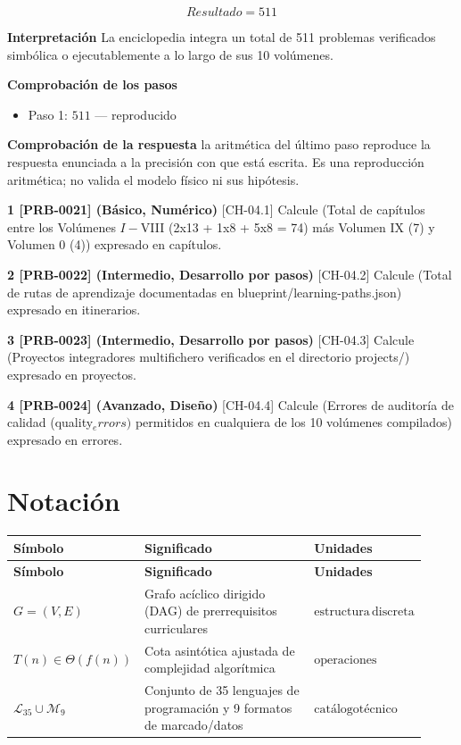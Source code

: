 \documentclass{book}
\begin{document}
\begin{tcolorbox}[title={Problema resuelto}, studiumworked, breakable]
\[
Resultado = 511
\]

\noindent\textbf{Interpretación}
La enciclopedia integra un total de 511 problemas verificados simbólica o ejecutablemente a lo largo de sus 10 volúmenes.

\noindent\textbf{Comprobación de los pasos}
\begin{itemize}
\item Paso 1: $511$ — reproducido
\end{itemize}

\noindent\textbf{Comprobación de la respuesta} la aritmética del último paso reproduce la respuesta enunciada a la precisión con que está escrita. Es una reproducción aritmética; no valida el modelo físico ni sus hipótesis.
\end{tcolorbox}

\begin{tcolorbox}[title={Ejercicios}, studiumworked, breakable]

\noindent\textbf{1 [PRB-0021] (Básico, Numérico)}
[CH-04.1] Calcule (Total de capítulos entre los Volúmenes \(I-\)VIII (2x13 + 1x8 + 5x8 = 74) más Volumen IX (7) y Volumen 0 (4)) expresado en capítulos.

\noindent\textbf{2 [PRB-0022] (Intermedio, Desarrollo por pasos)}
[CH-04.2] Calcule (Total de rutas de aprendizaje documentadas en blueprint/learning-paths.json) expresado en itinerarios.

\noindent\textbf{3 [PRB-0023] (Intermedio, Desarrollo por pasos)}
[CH-04.3] Calcule (Proyectos integradores multifichero verificados en el directorio projects/) expresado en proyectos.

\noindent\textbf{4 [PRB-0024] (Avanzado, Diseño)}
[CH-04.4] Calcule (Errores de auditoría de calidad (quality\(_errors)\) permitidos en cualquiera de los 10 volúmenes compilados) expresado en errores.
\end{tcolorbox}
\appendix
\chapter{Notación}

\begingroup
\setlength{\LTpre}{0pt}
\setlength{\LTpost}{0pt}
\begin{longtable}{@{}>{\centering\arraybackslash}p{0.17\linewidth}>{\raggedright\arraybackslash}p{0.55\linewidth}>{\raggedright\arraybackslash}p{0.2\linewidth}@{}}
\textbf{Símbolo} & \textbf{Significado} & \textbf{Unidades} \\
\hline
\endfirsthead
\textbf{Símbolo} & \textbf{Significado} & \textbf{Unidades} \\
\hline
\endhead
$G = (V, E)$ & Grafo acíclico dirigido (DAG) de prerrequisitos curriculares & $\mathrm{estructura}\,\mathrm{discreta}$ \\
$T(n) \in \Theta(f(n))$ & Cota asintótica ajustada de complejidad algorítmica & $\mathrm{operaciones}$ \\
$\mathcal{L}_{35} \cup \mathcal{M}_{9}$ & Conjunto de 35 lenguajes de programación y 9 formatos de marcado/datos & $\mathrm{catálogo técnico}$ \\
\end{longtable}
\endgroup
\end{document}
